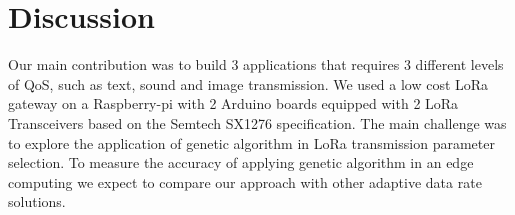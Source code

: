 \section{Discussion} \label{sec:Conclusion}


Our main contribution was to build 3 applications that requires 3 different levels of QoS,
	such as text,
	sound and image transmission.
We used a low cost LoRa gateway on a Raspberry-pi with 2 Arduino boards equipped with 2 LoRa Transceivers based on the Semtech SX1276 specification.
The main challenge  was to explore the application of genetic algorithm in LoRa transmission parameter selection.
To measure the accuracy of applying genetic algorithm in an edge computing we expect to compare our approach with other adaptive data rate solutions.







